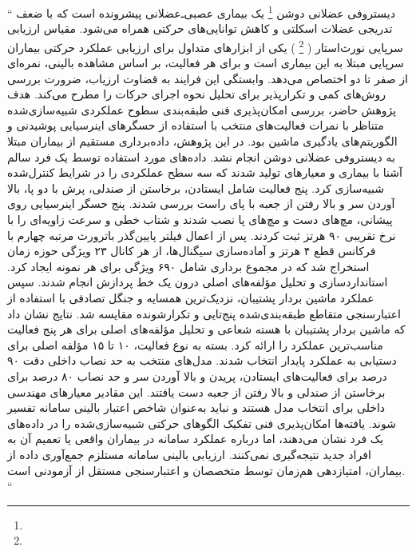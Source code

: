 \begin{PersianAbstract}
	
	``
	دیستروفی عضلانی دوشن 
	\footnote{} 
	یک بیماری عصبی‌ـ‌عضلانی پیشرونده است که با ضعف تدریجی عضلات اسکلتی و کاهش توانایی‌های حرکتی همراه می‌شود. مقیاس ارزیابی سرپایی نورث‌استار (
	 \footnote{}
	) یکی از ابزارهای متداول برای ارزیابی عملکرد حرکتی بیماران سرپایی مبتلا به این بیماری است و برای هر فعالیت، بر اساس مشاهده بالینی، نمره‌ای از صفر تا دو اختصاص می‌دهد. وابستگی این فرایند به قضاوت ارزیاب، ضرورت بررسی روش‌های کمی و تکرارپذیر برای تحلیل نحوه اجرای حرکات را مطرح می‌کند. هدف پژوهش حاضر، بررسی امکان‌پذیری فنی طبقه‌بندی سطوح عملکردی شبیه‌سازی‌شده متناظر با نمرات فعالیت‌های منتخب 
	 با استفاده از حسگرهای اینرسیایی پوشیدنی و الگوریتم‌های یادگیری ماشین بود.
	در این پژوهش، داده‌برداری مستقیم از بیماران مبتلا به دیستروفی عضلانی دوشن انجام نشد. داده‌های مورد استفاده توسط یک فرد سالم آشنا با بیماری و معیارهای 
	 تولید شدند که سه سطح عملکردی را در شرایط کنترل‌شده شبیه‌سازی کرد. پنج فعالیت شامل ایستادن، برخاستن از صندلی، پرش با دو پا، بالا آوردن سر و بالا رفتن از جعبه با پای راست بررسی شدند. پنج حسگر اینرسیایی روی پیشانی، مچ‌های دست و مچ‌های پا نصب شدند و شتاب خطی و سرعت زاویه‌ای را با نرخ تقریبی ۹۰ هرتز ثبت کردند. پس از اعمال فیلتر پایین‌گذر باترورث مرتبه چهارم با فرکانس قطع ۴ هرتز و آماده‌سازی سیگنال‌ها، از هر کانال ۲۳ ویژگی حوزه زمان استخراج شد که در مجموع برداری شامل ۶۹۰ ویژگی برای هر نمونه ایجاد کرد. استانداردسازی و تحلیل مؤلفه‌های اصلی درون یک خط پردازش انجام شدند. سپس عملکرد ماشین بردار پشتیبان، نزدیک‌ترین همسایه و جنگل تصادفی با استفاده از اعتبارسنجی متقاطع طبقه‌بندی‌شده پنج‌تایی و تکرارشونده مقایسه شد.
	نتایج نشان داد که ماشین بردار پشتیبان با هسته شعاعی و تحلیل مؤلفه‌های اصلی برای هر پنج فعالیت مناسب‌ترین عملکرد را ارائه کرد. بسته به نوع فعالیت، ۱۰ تا ۱۵ مؤلفه اصلی برای دستیابی به عملکرد پایدار انتخاب شدند. مدل‌های منتخب به حد نصاب داخلی دقت ۹۰ درصد برای فعالیت‌های ایستادن، پریدن و بالا آوردن سر و حد نصاب ۸۰ درصد برای برخاستن از صندلی و بالا رفتن از جعبه دست یافتند. این مقادیر معیارهای مهندسی داخلی برای انتخاب مدل هستند و نباید به‌عنوان شاخص اعتبار بالینی سامانه تفسیر شوند.
	یافته‌ها امکان‌پذیری فنی تفکیک الگوهای حرکتی شبیه‌سازی‌شده را در داده‌های یک فرد نشان می‌دهند، اما درباره عملکرد سامانه در بیماران واقعی یا تعمیم آن به افراد جدید نتیجه‌گیری نمی‌کنند. ارزیابی بالینی سامانه مستلزم جمع‌آوری داده از بیماران، امتیازدهی هم‌زمان توسط متخصصان و اعتبارسنجی مستقل از آزمودنی است.
	``
	
	
	
\end{PersianAbstract}
